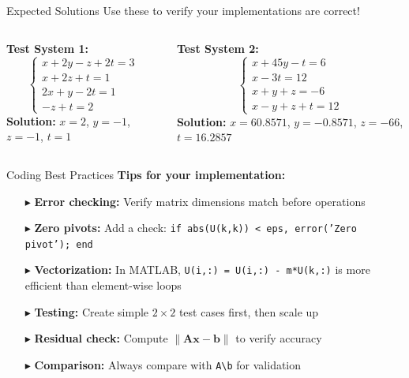 \documentclass[aspectratio=169]{beamer}
\begin{document}
\begin{frame}{Expected Solutions}
	\alert{Use these to verify your implementations are correct!}
	\vspace{1cm}

	\begin{columns}
		\textbf{Test System 1:}
		\begin{equation*}
			\begin{cases}
				x + 2y - z + 2t = 3 \\
				x + 2z + t = 1      \\
				2x + y - 2t = 1     \\
				-z + t = 2
			\end{cases}
		\end{equation*}
		\textbf{Solution:} $x = 2$, $y = -1$, $z = -1$, $t = 1$

		\textbf{Test System 2:}
		\begin{equation*}
			\begin{cases}
				x + 45y - t = 6 \\
				x - 3t = 12     \\
				x + y + z = -6  \\
				x - y + z + t = 12
			\end{cases}
		\end{equation*}
		\textbf{Solution:} $x = 60.8571$, $y = -0.8571$, $z = -66$, $t = 16.2857$

	\end{columns}
\end{frame}

\begin{frame}{Coding Best Practices}
	\textbf{Tips for your implementation:}
	\begin{itemize}
		\item[$\blacktriangleright$]
		      \textbf{Error checking:} Verify matrix dimensions match before operations
		      \vspace{0.2cm}
		\item[$\blacktriangleright$]
		      \textbf{Zero pivots:} Add a check: \texttt{if abs(U(k,k)) < eps, error('Zero pivot'); end}
		      \vspace{0.2cm}
		\item[$\blacktriangleright$]
		      \textbf{Vectorization:} In MATLAB, \texttt{U(i,:) = U(i,:) - m*U(k,:)} is more efficient than element-wise loops
		      \vspace{0.2cm}
		\item[$\blacktriangleright$]
		      \textbf{Testing:} Create simple $2\times2$ test cases first, then scale up
		      \vspace{0.2cm}
		\item[$\blacktriangleright$]
		      \textbf{Residual check:} Compute $\|\mathbf{Ax} - \mathbf{b}\|$ to verify accuracy
		      \vspace{0.2cm}
		\item[$\blacktriangleright$]
		      \textbf{Comparison:} Always compare with \texttt{A\textbackslash b} for validation
	\end{itemize}
\end{frame}
\end{document}
